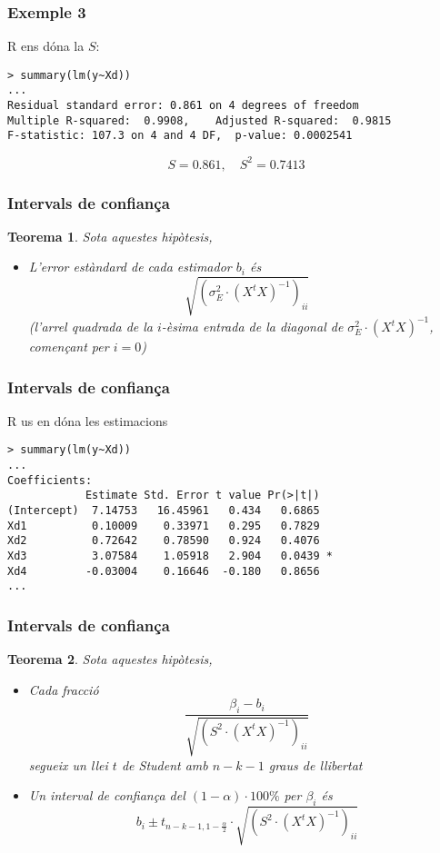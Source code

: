 \documentclass[12pt,t]{beamer}
\theoremstyle{plain}
\newtheorem{teorema}{Teorema}
\theoremstyle{definition}
\begin{document}
\begin{frame}[fragile]
\frametitle{Exemple 3}

R ens dóna la $S$:
\footnotesize

\begin{verbatim}
> summary(lm(y~Xd))
...
Residual standard error: 0.861 on 4 degrees of freedom
Multiple R-squared:  0.9908,	Adjusted R-squared:  0.9815 
F-statistic: 107.3 on 4 and 4 DF,  p-value: 0.0002541
\end{verbatim}
$$
S=0.861,\quad S^2=0.7413
$$



\end{frame}






\begin{frame}
\frametitle{Intervals de confiança}
\begin{teorema}
Sota aquestes hipòtesis, 
\begin{itemize}
\item L'error estàndard de cada estimador $b_i$ és 
$$
\sqrt{(\sigma_E^2\cdot (X^t X)^{-1})_{ii}}
$$
(l'arrel quadrada de la $i$-èsima entrada de la diagonal de $\sigma_E^2\cdot (X^t X)^{-1}$, començant per $i=0$)
\end{itemize}
\end{teorema}
\end{frame}



\begin{frame}[fragile]
\frametitle{Intervals de confiança}
R us en dóna les estimacions

\small
\begin{verbatim}
> summary(lm(y~Xd))
...
Coefficients:
            Estimate Std. Error t value Pr(>|t|)  
(Intercept)  7.14753   16.45961   0.434   0.6865  
Xd1          0.10009    0.33971   0.295   0.7829  
Xd2          0.72642    0.78590   0.924   0.4076  
Xd3          3.07584    1.05918   2.904   0.0439 *
Xd4         -0.03004    0.16646  -0.180   0.8656  
...
\end{verbatim}



\end{frame}






\begin{frame}
\frametitle{Intervals de confiança}
\begin{teorema}
Sota aquestes hipòtesis, 
\begin{itemize}
\item Cada fracció 
$$
\frac{\beta_i-b_i}{\sqrt{(S^2\cdot (X^t X)^{-1})_{ii}}}
$$
segueix un llei $t$ de Student amb $n-k-1$ graus de llibertat
\medskip

\item Un interval de confiança del $(1-\alpha)\cdot 100\%$ per $\beta_i$ és
$$
b_i\pm t_{n-k-1,1-\frac{\alpha}{2}}\cdot \sqrt{(S^2\cdot (X^t X)^{-1})_{ii}}
$$
\end{itemize}
\end{teorema}
\end{frame}
\end{document}
